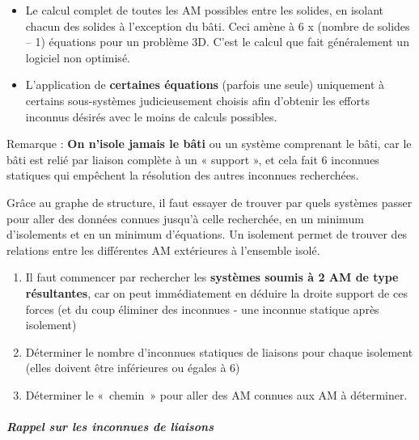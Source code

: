 \begin{itemize}
\item
  Le calcul complet de toutes les AM possibles entre les solides, en isolant chacun des solides à l'exception du bâti. Ceci amène à 6 x (nombre de solides -- 1) équations pour un problème 3D. C'est le calcul que fait généralement un logiciel non optimisé.
\item
  L'application de \textbf{certaines équations} (parfois une seule) uniquement à certains sous-systèmes judicieusement choisis afin d'obtenir les efforts inconnus désirés avec le moins de calculs possibles.
\end{itemize}

Remarque : \textbf{On n'isole jamais le bâti} ou un système comprenant le bâti, car le bâti est relié par liaison complète à un « support », et cela fait 6 inconnues statiques qui empêchent la résolution des autres inconnues recherchées.

Grâce au graphe de structure, il faut essayer de trouver par quels systèmes passer pour aller des données connues jusqu'à celle recherchée, en un minimum d'isolements et en un minimum d'équations. Un isolement permet de trouver des relations entre les différentes AM extérieures à l'ensemble isolé.

\begin{enumerate}
\def\labelenumi{\arabic{enumi}.}
\item
  Il faut commencer par rechercher les \textbf{systèmes soumis à 2 AM de type résultantes}, car on peut immédiatement en déduire la droite support de ces forces (et du coup éliminer des inconnues - une inconnue statique après isolement)
\item
  Déterminer le nombre d'inconnues statiques de liaisons pour chaque isolement (elles doivent être inférieures ou égales à 6)
\item
  Déterminer le «~chemin~» pour aller des AM connues aux AM à déterminer.
\end{enumerate}

\hypertarget{rappel-sur-les-inconnues-de-liaisons}{%
\subparagraph*{Rappel sur les inconnues de liaisons}\label{rappel-sur-les-inconnues-de-liaisons}}

